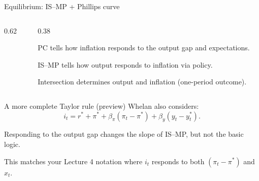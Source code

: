 \documentclass[aspectratio=169,xcolor=dvipsnames]{beamer}
\let\tempone\itemize
\let\temptwo\enditemize
\renewenvironment{itemize}{\tempone\addtolength{\itemsep}{\fill}}{\temptwo}
\newcommand{\axes}[4]{%
  \draw[axis] (#1,0) -- (#2,0);
  \draw[axis] (0,#3) -- (0,#4);
}
\newcommand{\xlabel}[1]{\node[below right] at (2.75,0) {#1};}
\newcommand{\ylabel}[1]{\node[above left] at (0,3.95) {#1};}
\begin{document}
\begin{frame}{Equilibrium: IS--MP + Phillips curve}
\begin{columns}
\begin{column}{0.62\textwidth}
\centering
{}
\end{column}
\begin{column}{0.38\textwidth}
\small
\begin{itemize}
\item PC tells how inflation responds to the output gap and expectations.
\item IS--MP tells how output responds to inflation via policy.
\item Intersection determines output and inflation (one-period outcome).
\end{itemize}
\end{column}
\end{columns}
\end{frame}

\begin{frame}{A more complete Taylor rule (preview)}
\small
Whelan also considers:
\[
i_t = r^\ast+\pi^\ast+\beta_\pi(\pi_t-\pi^\ast)+\beta_y(y_t-y_t^\ast).
\]
\begin{itemize}
\item Responding to the output gap changes the slope of IS--MP, but not the basic logic.
\item This matches your Lecture 4 notation where $i_t$ responds to both $(\pi_t-\pi^\ast)$ and $x_t$.
\end{itemize}
\end{frame}

\end{document}

